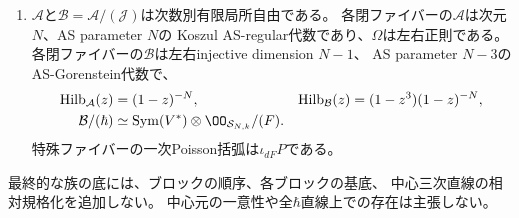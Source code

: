 \begin{theorem}[満support層の全係数にわたる同変中心元]
\begin{enumerate}
\item $\mathcal A$と$\mathcal B=\mathcal A/(\mathcal J)$は次数別有限局所自由である。
各閉ファイバーの$\mathcal A$は次元$N$、AS parameter $N$の
Koszul AS-regular代数であり、$\Omega$は左右正則である。
各閉ファイバーの$\mathcal B$は左右injective dimension $N-1$、
AS parameter $N-3$のAS-Gorenstein代数で、
\begin{equation}
 \begin{aligned}
 \operatorname{Hilb}_{\mathcal A}(z)&=(1-z)^{-N},&
 \operatorname{Hilb}_{\mathcal B}(z)&=(1-z^3)(1-z)^{-N},\\
 \mathcal B/(\hbar)&\simeq
 \operatorname{Sym}(V^*)\otimes\OO_{\mathcal S_{N,k}}/(F).
 \end{aligned}
 \label{eq:pg-full-support-flat-quotient}
\end{equation}
特殊ファイバーの一次Poisson括弧は$\iota_{dF}P$である。
\end{enumerate}
最終的な族の底には、ブロックの順序、各ブロックの基底、
中心三次直線の相対規格化を追加しない。
中心元の一意性や全$\hbar$直線上での存在は主張しない。
\end{theorem}
